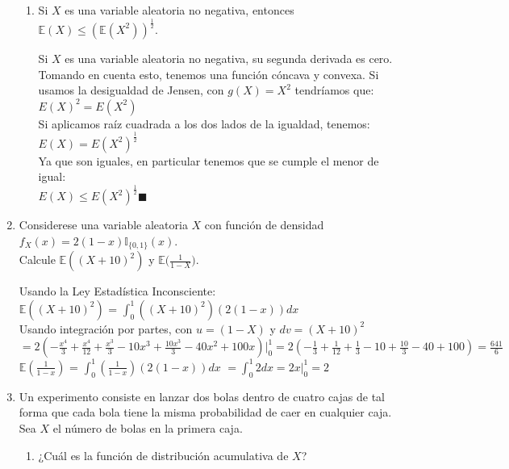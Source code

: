 \documentclass[12pt,a4paper]{report}
\begin{document}
\begin{enumerate}
{\begin{enumerate}
{				
				}

				\item {
					Si $X$ es una variable aleatoria no negativa, entonces
					$\mathbb{E}(X) \leq (\mathbb{E}(X^2))^{\frac{1}{2}}$.
					
					Si $X$ es una variable aleatoria no negativa, su segunda derivada es cero. Tomando en cuenta esto, tenemos una función cóncava y convexa. Si usamos la desigualdad de Jensen, con $g(X) = X^2$ tendríamos que:\\
					
					$E(X)^2 = E(X^2)$\\
					
					Si aplicamos raíz cuadrada a los dos lados de la igualdad, tenemos:\\
					$E(X) = E(X^2)^{\frac{1}{2}}$\\
					
					Ya que son iguales, en particular tenemos que se cumple el menor de igual:\\
					$E(X) \leq E(X^2)^{\frac{1}{2}}\blacksquare$
					
				}
			\end{enumerate}
		}

		\item{
			Considerese una variable aleatoria $X$ con función de densidad
			$f_X(x) = 2(1-x)\mathbb{I}_{\{0, 1\}}(x)$.\\
			Calcule $\mathbb{E}((X+10)^2)$ y
			$\mathbb{E}\Big(\frac{1}{1-X}\Big)$.
			
			Usando la Ley Estadística Inconsciente:\\
			
			$\mathbb{E}((X+10)^2)$ = $\int_{0}^{1}((X+10)^2)(2(1-x))dx$\\
			Usando integración por partes, con $u = (1-X)$ y $dv = (X+10)^2$\\ 
			$= 2(-\frac{x^4}{3} + \frac{x^4}{12} + \frac{x^3}{3} - 10x^3 + \frac{10x^3}{3} - 40x^2 + 100x)\Big|_{0}^{1} = 2(-\frac{1}{3} + \frac{1}{12} + \frac{1}{3} - 10 + \frac{10}{3} - 40 + 100) = \frac{641}{6}$\\
			
			$\mathbb{E}(\frac{1}{1-x})$ = $\int_{0}^{1}(\frac{1}{1-x})(2(1-x))dx$
			$= \int_{0}^{1}2dx = 2x\Big|_{0}^{1} = 2$\\
			
		}

		\item{
			Un experimento consiste en lanzar dos bolas dentro de cuatro cajas
			de tal forma que cada bola tiene la misma probabilidad de caer en
			cualquier caja. Sea $X$ el número de bolas en la primera caja.
			\begin{enumerate}
				\item {
					¿Cuál es la función de distribución acumulativa de $X$?
					
}
\end{enumerate}}
\end{enumerate}
\end{document}
